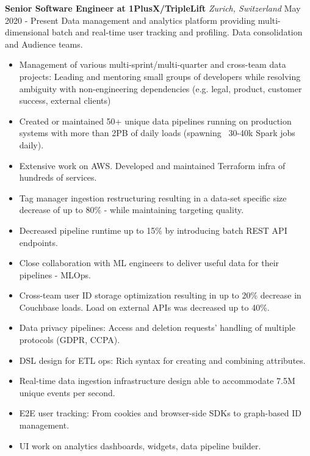 \documentclass{article}
\begin{document}
        \begin{flushleft}
            \textbf{\large Senior Software Engineer at 1PlusX/TripleLift} \textit{\footnotesize Zurich, Switzerland} \hfill \small May 2020 - Present \newline
            Data management and analytics platform providing multi-dimensional batch and real-time user tracking and profiling. Data consolidation and Audience teams. 
            \newline
            \begin{itemize}
                \item Management of various multi-sprint/multi-quarter and cross-team data projects: Leading and mentoring small groups of developers while resolving ambiguity with non-engineering dependencies (e.g. legal, product, customer success, external clients)
                \item Created or maintained 50+ unique data pipelines running on production systems with more than 2PB of daily loads (spawning ~30-40k Spark jobs daily).
                \item Extensive work on AWS. Developed and maintained Terraform infra of hundreds of services.
                \item Tag manager ingestion restructuring resulting in a data-set specific size decrease of up to 80\% - while maintaining targeting quality.
                \item Decreased pipeline runtime up to 15\% by introducing batch REST API endpoints.
                \item Close collaboration with ML engineers to deliver useful data for their pipelines - MLOps.
                \item Cross-team user ID storage optimization resulting in up to 20\% decrease in Couchbase loads. Load on external APIs was decreased up to 40\%. 
                \item Data privacy pipelines: Access and deletion requests' handling of multiple protocols (GDPR, CCPA).
			\item DSL design for ETL ops: Rich syntax for creating and combining attributes.
			\item Real-time data ingestion infrastructure design able to accommodate 7.5M unique events per second.
			\item E2E user tracking: From cookies and browser-side SDKs to graph-based ID management.
                \item UI work on analytics dashboards, widgets, data pipeline builder.
            \end{itemize}
                                          \\ [1ex] 
        \end{flushleft}
\end{document}
